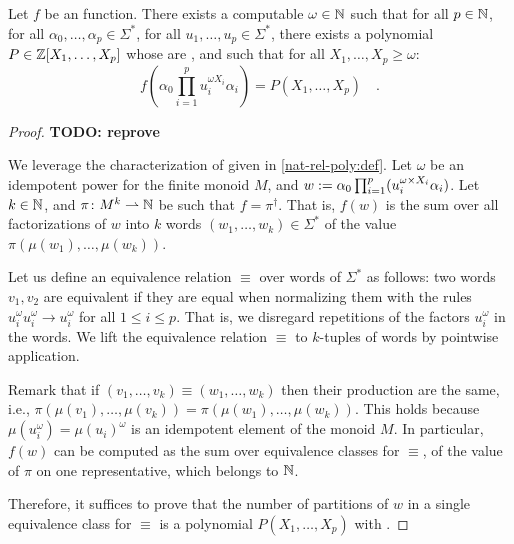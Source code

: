 \begin{lemma}
    \label{n-poly-combinatorics:lem}
    Let $f$ be an  function. 
    There exists a computable $\omega \in \mathbb{N}$
    such that for all $p \in \mathbb{N}$,
    for all $\alpha_0, \dots, \alpha_p \in \Sigma^*$,
    for all $u_1, \dots, u_p \in \Sigma^*$,
    there exists a polynomial $P \in \mathbb{Z}[X_1, \dots, X_p]$
    whose  are ,
    and such that for all $X_1, \dots, X_p \geq \omega$:
    \begin{equation*}
        f\left(
            \alpha_0 \prod_{i = 1}^p u_i^{\omega X_i} \alpha_i
        \right)
        = P(X_1, \dots, X_p) \quad .
    \end{equation*}
\end{lemma}
\begin{proof}
    \textbf{TODO: reprove}

    We leverage the characterization of 
    given in \cref{nat-rel-poly:def}.
    Let $\omega$ be an idempotent power for the finite monoid $M$,
    and
    $w \mathrel{:=} \alpha_0 \prod_{i = 1}^p (u_i^{\omega \times X_i} \alpha_i)$.
    Let $k \in \mathbb{N}$, and $\pi \colon M^k \rightharpoonup \mathbb{N}$ be such that
    $f = \pi^\dagger$. That is, 
    $f(w)$ is the sum over all factorizations of $w$
    into $k$ words $(w_1, \dots, w_k) \in \Sigma^*$
    of the value $\pi(\mu(w_1), \dots, \mu(w_k))$.

    Let us define an equivalence relation $\equiv$ over words of
    $\Sigma^*$ as follows: two words $v_1, v_2$ are equivalent if they are
    equal when normalizing them with the rules $u_i^{\omega} u_i^{\omega} \to
    u_i^{\omega}$ for all $1 \leq i \leq p$. That is, we disregard
    repetitions of the factors $u_i^{\omega}$ in the words.
    We lift the equivalence relation $\equiv$ to $k$-tuples of
    words by pointwise application.

    Remark that if $(v_1, \dots, v_k) \equiv (w_1, \dots, w_k)$ then their
    production are the same, i.e., $\pi(\mu(v_1), \dots, \mu(v_k)) =
    \pi(\mu(w_1), \dots, \mu(w_k))$. This holds because $\mu(u_i^\omega) =
    \mu(u_i)^\omega$ is an idempotent element of the monoid $M$. In particular,
    $f(w)$ can be computed as the sum over equivalence classes for $\equiv$, of
    the value of $\pi$ on one representative, which belongs to $\mathbb{N}$.

    Therefore, it suffices to prove that the number of partitions of $w$ in a
    single equivalence class for $\equiv$ is a polynomial $P(X_1, \dots, X_p)$
    with  .


\end{proof}
